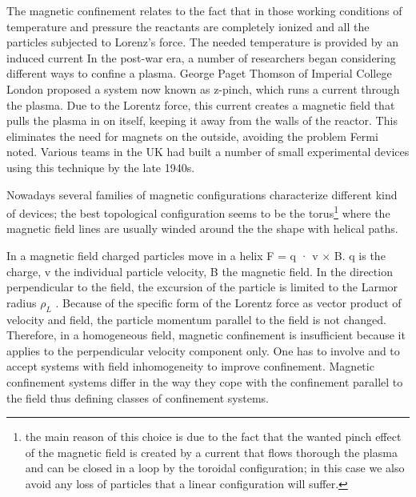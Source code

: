%
The magnetic confinement relates to the fact that in those working conditions of temperature and pressure the reactants are completely ionized and all the particles subjected to Lorenz's force. The needed temperature is provided by an induced current 
%
In the post-war era, a number of researchers began considering different ways to confine a plasma. George Paget Thomson of Imperial College London proposed a system now known as z-pinch, which runs a current through the plasma. Due to the Lorentz force, this current creates a magnetic field that pulls the plasma in on itself, keeping it away from the walls of the reactor. This eliminates the need for magnets on the outside, avoiding the problem Fermi noted. Various teams in the UK had built a number of small experimental devices using this technique by the late 1940s.







%
Nowadays several families of magnetic configurations characterize different kind of devices; the best topological configuration seems to be the torus\footnote{the main reason of this choice is due to the fact that the wanted pinch effect of the magnetic field is created by a current that flows thorough the plasma and can be closed in a loop by the toroidal configuration; in this case we also avoid any loss of particles that a linear configuration will suffer.} where the magnetic field lines are usually winded around the the shape with helical paths. 
%

In a magnetic field charged particles move in a helix  F = q · v × B.  q is the charge, v the individual particle velocity, B the magnetic field. In the direction perpendicular to the field, the excursion of the particle is limited to the Larmor radius $\rho_L$ . Because of the specific form of the Lorentz force as vector product of velocity and field, the particle momentum parallel to the field is not changed. Therefore, in a homogeneous field, magnetic confinement is insufficient because it applies to the perpendicular velocity component only. One has to involve and to accept systems with field inhomogeneity to improve confinement. Magnetic confinement systems differ in the way they cope with the confinement parallel to the field thus defining classes of confinement systems.


